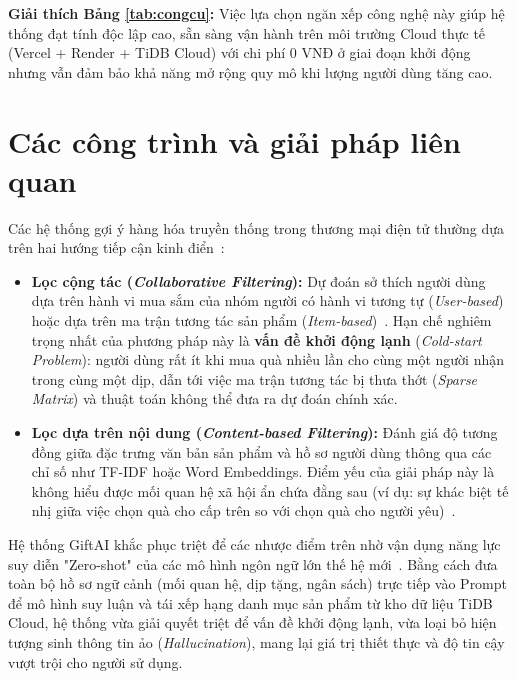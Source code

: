 \noindent \textbf{Giải thích Bảng \ref{tab:congcu}:} Việc lựa chọn ngăn xếp công nghệ này giúp hệ thống đạt tính độc lập cao, sẵn sàng vận hành trên môi trường Cloud thực tế (Vercel + Render + TiDB Cloud) với chi phí $0\text{ VNĐ}$ ở giai đoạn khởi động nhưng vẫn đảm bảo khả năng mở rộng quy mô khi lượng người dùng tăng cao.


\section{Các công trình và giải pháp liên quan}

Các hệ thống gợi ý hàng hóa truyền thống trong thương mại điện tử thường dựa trên hai hướng tiếp cận kinh điển~\cite{recommender_handbook}:

\begin{itemize}[leftmargin=1.2cm, itemsep=3pt]
    \item \textbf{Lọc cộng tác (\textit{Collaborative Filtering}):} Dự đoán sở thích người dùng dựa trên hành vi mua sắm của nhóm người có hành vi tương tự (\textit{User-based}) hoặc dựa trên ma trận tương tác sản phẩm (\textit{Item-based})~\cite{recommender_handbook}. Hạn chế nghiêm trọng nhất của phương pháp này là \textbf{vấn đề khởi động lạnh} (\textit{Cold-start Problem}): người dùng rất ít khi mua quà nhiều lần cho cùng một người nhận trong cùng một dịp, dẫn tới việc ma trận tương tác bị thưa thớt (\textit{Sparse Matrix}) và thuật toán không thể đưa ra dự đoán chính xác.
    
    \item \textbf{Lọc dựa trên nội dung (\textit{Content-based Filtering}):} Đánh giá độ tương đồng giữa đặc trưng văn bản sản phẩm và hồ sơ người dùng thông qua các chỉ số như TF-IDF hoặc Word Embeddings. Điểm yếu của giải pháp này là không hiểu được mối quan hệ xã hội ẩn chứa đằng sau (ví dụ: sự khác biệt tế nhị giữa việc chọn quà cho cấp trên so với chọn quà cho người yêu)~\cite{gift_recsys}.
\end{itemize}

Hệ thống GiftAI khắc phục triệt để các nhược điểm trên nhờ vận dụng năng lực suy diễn "Zero-shot" của các mô hình ngôn ngữ lớn thế hệ mới~\cite{gemini_team, llm_reranking}. Bằng cách đưa toàn bộ hồ sơ ngữ cảnh (mối quan hệ, dịp tặng, ngân sách) trực tiếp vào Prompt để mô hình suy luận và tái xếp hạng danh mục sản phẩm từ kho dữ liệu TiDB Cloud, hệ thống vừa giải quyết triệt để vấn đề khởi động lạnh, vừa loại bỏ hiện tượng sinh thông tin ảo (\textit{Hallucination}), mang lại giá trị thiết thực và độ tin cậy vượt trội cho người sử dụng.